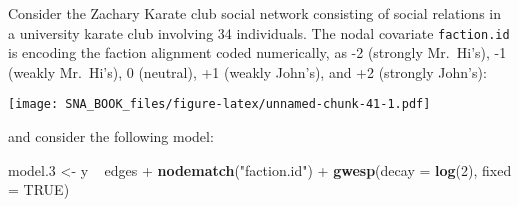 \documentclass[]{book}
\newenvironment{Shaded}{\begin{snugshade}}{\end{snugshade}}
\newcommand{\KeywordTok}[1]{\textcolor[rgb]{0.13,0.29,0.53}{\textbf{{#1}}}}
\newcommand{\DataTypeTok}[1]{\textcolor[rgb]{0.13,0.29,0.53}{{#1}}}
\newcommand{\DecValTok}[1]{\textcolor[rgb]{0.00,0.00,0.81}{{#1}}}
\newcommand{\FloatTok}[1]{\textcolor[rgb]{0.00,0.00,0.81}{{#1}}}
\newcommand{\StringTok}[1]{\textcolor[rgb]{0.31,0.60,0.02}{{#1}}}
\newcommand{\OtherTok}[1]{\textcolor[rgb]{0.56,0.35,0.01}{{#1}}}
\newcommand{\NormalTok}[1]{{#1}}
\begin{document}
Consider the Zachary Karate club social network consisting of social
relations in a university karate club involving 34 individuals. The
nodal covariate \texttt{faction.id} is encoding the faction alignment
coded numerically, as -2 (strongly Mr.~Hi's), -1 (weakly Mr.~Hi's), 0
(neutral), +1 (weakly John's), and +2 (strongly John's):

\begin{Shaded}
\end{Shaded}

\texttt{[image: SNA\_BOOK\_files/figure-latex/unnamed-chunk-41-1.pdf]}

and consider the following model:

\begin{Shaded}
\begin{Highlighting}[]
\NormalTok{model}\FloatTok{.3} \NormalTok{<-}\StringTok{ }\NormalTok{y ~}\StringTok{ }\NormalTok{edges +}\StringTok{ }
\StringTok{               }\KeywordTok{nodematch}\NormalTok{(}\StringTok{"faction.id"}\NormalTok{) +}
\StringTok{               }\KeywordTok{gwesp}\NormalTok{(}\DataTypeTok{decay =} \KeywordTok{log}\NormalTok{(}\DecValTok{2}\NormalTok{), }\DataTypeTok{fixed =} \OtherTok{TRUE}\NormalTok{)}
\end{Highlighting}
\end{Shaded}
\end{document}
